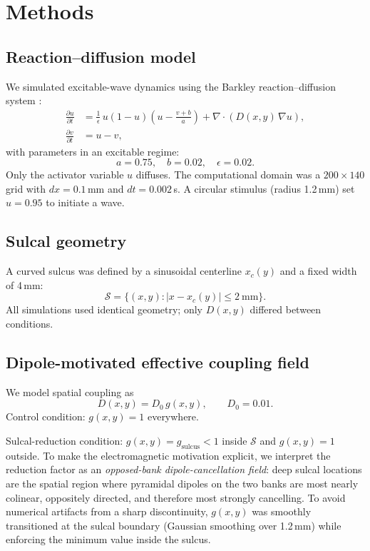 \documentclass[12pt]{article}
\begin{document}
\section{Methods}

\subsection{Reaction--diffusion model}

We simulated excitable-wave dynamics using the Barkley reaction--diffusion system \citep{Barkley1991}:
\begin{align}
\frac{\partial u}{\partial t} &= \frac{1}{\epsilon}\,u(1-u)\left(u - \frac{v+b}{a}\right)
+ \nabla\cdot\!\left(D(x,y)\,\nabla u\right), \\
\frac{\partial v}{\partial t} &= u - v,
\end{align}
with parameters in an excitable regime:
\[
a=0.75,\quad b=0.02,\quad \epsilon=0.02.
\]
Only the activator variable $u$ diffuses. The computational domain was a $200\times 140$ grid with $dx=0.1$\,mm and $dt=0.002$\,s. A circular stimulus (radius 1.2\,mm) set $u=0.95$ to initiate a wave.

\subsection{Sulcal geometry}

A curved sulcus was defined by a sinusoidal centerline $x_c(y)$ and a fixed width of 4\,mm:
\[
\mathcal{S}=\{(x,y):|x-x_c(y)|\le 2~\mathrm{mm}\}.
\]
All simulations used identical geometry; only $D(x,y)$ differed between conditions.

\subsection{Dipole-motivated effective coupling field}

We model spatial coupling as
\[
D(x,y)=D_0\,g(x,y),\qquad D_0=0.01.
\]
Control condition: $g(x,y)=1$ everywhere.

Sulcal-reduction condition: $g(x,y)=g_{\mathrm{sulcus}}<1$ inside $\mathcal{S}$ and $g(x,y)=1$ outside. To make the electromagnetic motivation explicit, we interpret the reduction factor as an \emph{opposed-bank dipole-cancellation field}: deep sulcal locations are the spatial region where pyramidal dipoles on the two banks are most nearly colinear, oppositely directed, and therefore most strongly cancelling. To avoid numerical artifacts from a sharp discontinuity, $g(x,y)$ was smoothly transitioned at the sulcal boundary (Gaussian smoothing over 1.2\,mm) while enforcing the minimum value inside the sulcus.
\end{document}
